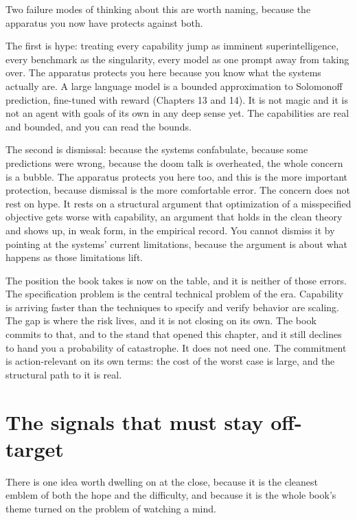 Two failure modes of thinking about this are worth naming, because the apparatus you now have protects against both.

The first is hype: treating every capability jump as imminent superintelligence, every benchmark as the singularity, every model as one prompt away from taking over. The apparatus protects you here because you know what the systems actually are. A large language model is a bounded approximation to Solomonoff prediction, fine-tuned with reward (Chapters 13 and 14). It is not magic and it is not an agent with goals of its own in any deep sense yet. The capabilities are real and bounded, and you can read the bounds.

The second is dismissal: because the systems confabulate, because some predictions were wrong, because the doom talk is overheated, the whole concern is a bubble. The apparatus protects you here too, and this is the more important protection, because dismissal is the more comfortable error. The concern does not rest on hype. It rests on a structural argument that optimization of a misspecified objective gets worse with capability, an argument that holds in the clean theory and shows up, in weak form, in the empirical record. You cannot dismiss it by pointing at the systems' current limitations, because the argument is about what happens as those limitations lift.

The position the book takes is now on the table, and it is neither of those errors. The specification problem is the central technical problem of the era. Capability is arriving faster than the techniques to specify and verify behavior are scaling. The gap is where the risk lives, and it is not closing on its own. The book commits to that, and to the stand that opened this chapter, and it still declines to hand you a probability of catastrophe. It does not need one. The commitment is action-relevant on its own terms: the cost of the worst case is large, and the structural path to it is real.

\section*{The signals that must stay off-target}

There is one idea worth dwelling on at the close, because it is the cleanest emblem of both the hope and the difficulty, and because it is the whole book's theme turned on the problem of watching a mind.

